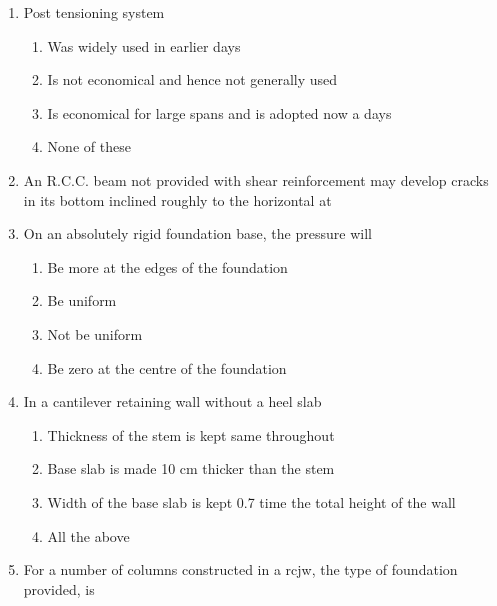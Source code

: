\documentclass[11pt,a4paper]{article}
\begin{document}
\begin{enumerate}
\item{Post tensioning system}
\begin{enumerate}[label=\Alph*.]
\item{Was widely used in earlier days}
\item{Is not economical and hence not generally used}
\item{Is economical for large spans and is adopted now a days}
\item{None of these}
\end{enumerate}
\item{An R.C.C. beam not provided with shear reinforcement may develop cracks in its bottom inclined roughly to the horizontal at}
\\
\item{On an absolutely rigid foundation base, the pressure will}
\begin{enumerate}[label=\Alph*.]
\item{Be more at the edges of the foundation}
\item{Be uniform}
\item{Not be uniform}
\item{Be zero at the centre of the foundation}
\end{enumerate}
\item{In a cantilever retaining wall without a heel slab}
\begin{enumerate}[label=\Alph*.]
\item{Thickness of the stem is kept same throughout}
\item{Base slab is made 10 cm thicker than the stem}
\item{Width of the base slab is kept 0.7 time the total height of the wall}
\item{All the above}
\end{enumerate}
\item{For a number of columns constructed in a rcjw, the type of foundation provided, is}
\\\begin{enumerate*}[itemjoin=\qquad, label=\Alph*.]

\end{enumerate*}
\end{enumerate}
\end{document}
